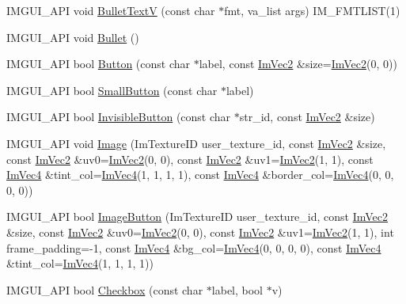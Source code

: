 \begin{DoxyCompactItemize}
I\+M\+G\+U\+I\+\_\+\+A\+PI void \hyperlink{namespace_im_gui_af8f4b5e96c745e205974857f9a584583}{Bullet\+TextV} (const char $\ast$fmt, va\+\_\+list args) I\+M\+\_\+\+F\+M\+T\+L\+I\+ST(1)
\item 
I\+M\+G\+U\+I\+\_\+\+A\+PI void \hyperlink{namespace_im_gui_ae2d22212681556d2c2398dfd152f3121}{Bullet} ()
\item 
I\+M\+G\+U\+I\+\_\+\+A\+PI bool \hyperlink{namespace_im_gui_a38094c568ce398db5a3abb9d3ac92030}{Button} (const char $\ast$label, const \hyperlink{struct_im_vec2}{Im\+Vec2} \&size=\hyperlink{struct_im_vec2}{Im\+Vec2}(0, 0))
\item 
I\+M\+G\+U\+I\+\_\+\+A\+PI bool \hyperlink{namespace_im_gui_a5b76ec69758aeb0a00a66f142f7a4fb2}{Small\+Button} (const char $\ast$label)
\item 
I\+M\+G\+U\+I\+\_\+\+A\+PI bool \hyperlink{namespace_im_gui_a22668d440cbbb1f8be07241d9c6d9096}{Invisible\+Button} (const char $\ast$str\+\_\+id, const \hyperlink{struct_im_vec2}{Im\+Vec2} \&size)
\item 
I\+M\+G\+U\+I\+\_\+\+A\+PI void \hyperlink{namespace_im_gui_ad8705ac3b718c1b2e84e7b8c34f90249}{Image} (Im\+Texture\+ID user\+\_\+texture\+\_\+id, const \hyperlink{struct_im_vec2}{Im\+Vec2} \&size, const \hyperlink{struct_im_vec2}{Im\+Vec2} \&uv0=\hyperlink{struct_im_vec2}{Im\+Vec2}(0, 0), const \hyperlink{struct_im_vec2}{Im\+Vec2} \&uv1=\hyperlink{struct_im_vec2}{Im\+Vec2}(1, 1), const \hyperlink{struct_im_vec4}{Im\+Vec4} \&tint\+\_\+col=\hyperlink{struct_im_vec4}{Im\+Vec4}(1, 1, 1, 1), const \hyperlink{struct_im_vec4}{Im\+Vec4} \&border\+\_\+col=\hyperlink{struct_im_vec4}{Im\+Vec4}(0, 0, 0, 0))
\item 
I\+M\+G\+U\+I\+\_\+\+A\+PI bool \hyperlink{namespace_im_gui_ac79ef64e8b9e1db73d8237f6a999da14}{Image\+Button} (Im\+Texture\+ID user\+\_\+texture\+\_\+id, const \hyperlink{struct_im_vec2}{Im\+Vec2} \&size, const \hyperlink{struct_im_vec2}{Im\+Vec2} \&uv0=\hyperlink{struct_im_vec2}{Im\+Vec2}(0, 0), const \hyperlink{struct_im_vec2}{Im\+Vec2} \&uv1=\hyperlink{struct_im_vec2}{Im\+Vec2}(1, 1), int frame\+\_\+padding=-\/1, const \hyperlink{struct_im_vec4}{Im\+Vec4} \&bg\+\_\+col=\hyperlink{struct_im_vec4}{Im\+Vec4}(0, 0, 0, 0), const \hyperlink{struct_im_vec4}{Im\+Vec4} \&tint\+\_\+col=\hyperlink{struct_im_vec4}{Im\+Vec4}(1, 1, 1, 1))
\item 
I\+M\+G\+U\+I\+\_\+\+A\+PI bool \hyperlink{namespace_im_gui_a57d73c1d0ef807fef734d91024092027}{Checkbox} (const char $\ast$label, bool $\ast$v)
\item 

\end{DoxyCompactItemize}
